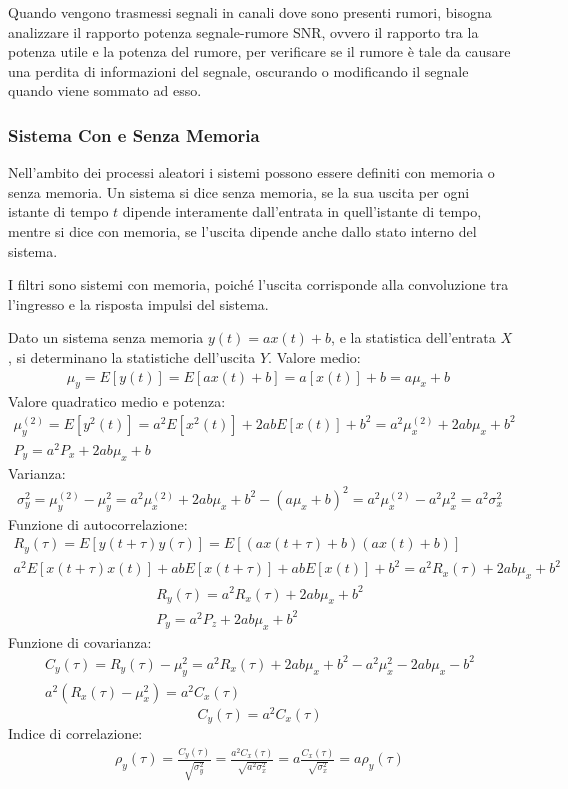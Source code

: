 \documentclass{article}
\numberwithin{equation}{subsection}
\begin{document}
Quando vengono trasmessi segnali in canali dove sono presenti rumori, bisogna analizzare il rapporto potenza segnale-rumore SNR, ovvero il rapporto tra la potenza utile e la 
potenza del rumore, per verificare se il rumore è tale da causare una perdita di informazioni del segnale, oscurando o modificando il segnale quando viene sommato ad esso. 

\subsubsection{Sistema Con e Senza Memoria}

Nell'ambito dei processi aleatori i sistemi possono essere definiti con memoria o senza memoria. Un sistema si dice senza memoria, se la sua uscita per ogni istante di 
tempo $t$ dipende interamente dall'entrata in quell'istante di tempo, mentre si dice con memoria, se l'uscita dipende anche dallo stato interno del sistema. 

I filtri sono sistemi con memoria, poiché l'uscita corrisponde alla convoluzione tra l'ingresso e la risposta impulsi del sistema. 

Dato un sistema senza memoria $y(t)=ax(t)+b$, e la statistica dell'entrata $X$, si determinano la statistiche dell'uscita $Y$. Valore medio:
\begin{gather*}
    \mu_y=E[y(t)]=E[ax(t)+b]=a[x(t)]+b=a\mu_x+b\
\end{gather*}
Valore quadratico medio e potenza:
\begin{gather*}
    \mu_y^{(2)}=E[y^2(t)]=a^2E[x^2(t)]+2abE[x(t)]+b^2=a^2\mu_x^{(2)}+2ab\mu_x+b^2\\
    P_y=a^2P_x+2ab\mu_x+b
\end{gather*}
Varianza:
\begin{gather*}
    \sigma_y^2=\mu_y^{(2)}-\mu_y^2=a^2\mu_x^{(2)}+2ab\mu_x+b^2-(a\mu_x+b)^2=a^2\mu_x^{(2)}-a^2\mu_x^2=a^2\sigma_x^2
\end{gather*}
Funzione di autocorrelazione:
\begin{gather*}
    R_y(\tau)=E[y(t+\tau)y(\tau)]=E[(ax(t+\tau)+b)(ax(t)+b)]\\
    a^2E[x(t+\tau)x(t)]+abE[x(t+\tau)]+abE[x(t)]+b^2=a^2R_x(\tau)+2ab\mu_x+b^2
\end{gather*}
\begin{gather}
    R_y(\tau)=a^2R_x(\tau)+2ab\mu_x+b^2\\
    P_y=a^2P_z+2ab\mu_x+b^2
\end{gather}
Funzione di covarianza:
\begin{gather*}
    C_y(\tau)=R_y(\tau)-\mu_y^2=a^2R_x(\tau)+2ab\mu_x+b^2-a^2\mu_x^2-2ab\mu_x-b^2\\
    a^2(R_x(\tau)-\mu_x^2)=a^2C_x(\tau)
\end{gather*}
\begin{equation}
    C_y(\tau)=a^2C_x(\tau)
\end{equation}
Indice di correlazione:
\begin{gather}
    \rho_y(\tau)=\displaystyle\frac{C_y(\tau)}{\sqrt{\sigma_y^2}}=\frac{a^2C_x(\tau)}{\sqrt{a^2\sigma_x^2}}=a\frac{C_x(\tau)}{\sqrt{\sigma_x^2}}=a\rho_y(\tau)
\end{gather}
\end{document}
